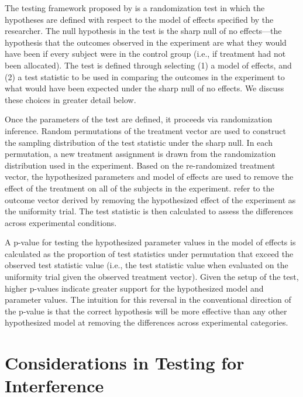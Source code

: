 \documentclass[12pt]{article}
\begin{document}
The testing framework proposed by \citet{bowers2012reasoning} is a randomization test \citep{basu2011randomization} in which the hypotheses are defined with respect to the model of effects specified by the researcher. The null hypothesis in the test is the sharp null of no effects---the hypothesis that the outcomes observed in the experiment are what they would have been if every subject were in the control group (i.e., if treatment had not been allocated). The test is defined through selecting (1) a model of effects, and (2) a test statistic to be used in comparing the outcomes in the experiment to what would have been expected under the sharp null of no effects. We discuss these choices in greater detail below.   

Once the parameters of the test are defined, it proceeds via randomization inference. Random permutations of the treatment vector are used to construct the sampling distribution of the test statistic under the sharp null.  In each permutation, a new treatment assignment is drawn from the randomization distribution used in the experiment. Based on the re-randomized treatment vector, the hypothesized parameters and model of effects are used to remove the effect of the treatment on all of the subjects in the experiment. \citet{bowers2012reasoning} refer to the outcome vector derived by removing the hypothesized effect of the experiment as the uniformity trial. The test statistic is then calculated to assess the differences across experimental conditions.

A p-value for testing the hypothesized parameter values in the model of effects is calculated as the proportion of test statistics under permutation that exceed the observed test statistic value (i.e., the test statistic value when evaluated on the uniformity trial given the observed treatment vector). Given the setup of the test, higher p-values indicate greater support for the hypothesized model and parameter values. The intuition for this reversal in the conventional direction of the p-value is that the correct hypothesis will be more effective than any other hypothesized model at removing the differences across experimental categories.

\section{Considerations in Testing for Interference}
\end{document}
